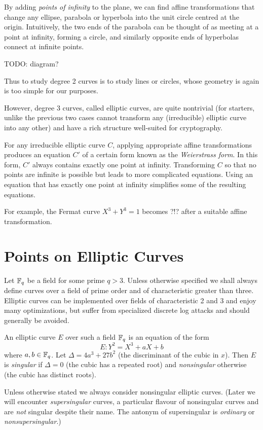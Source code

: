By adding \emph{points of infinity} to the plane, we can find affine
transformations that change any ellipse, parabola or hyperbola into the
unit circle centred at the origin. Intuitively, the two ends of the parabola
can be thought of as meeting
at a point at infinity, forming a circle,
and similarly opposite ends of hyperbolas connect at infinite points.

TODO: diagram?

Thus to study degree 2 curves is to study lines or circles, whose geometry
is again is too simple for our purposes.

However, degree 3 curves, called elliptic curves,
are quite nontrivial (for starters, unlike the previous two
cases cannot transform any (irreducible) elliptic curve into
any other)
and have a rich structure well-suited for cryptography.

For any irreducible elliptic curve $C$,
applying appropriate affine transformations
produces an equation $C'$ of a certain form known
as the \emph{Weierstrass form}.
In this form, $C'$ always contains exactly one point at infinity.
Transforming $C$ so
that no points are infinite is
possible but leads to more complicated
equations. Using an equation that has
exactly one point at infinity simplifies some of the resulting equations.

For example, the Fermat curve $X^3 + Y^3 = 1$ becomes
?!? after a suitable affine transformation.

\section {Points on Elliptic Curves}

Let $\mathbb{F}_q$ be a field for some prime $q > 3$.
Unless otherwise specified we shall always
define curves over a field of prime order and of characteristic greater
than three.
Elliptic curves can be implemented over fields of characteristic 2 and 3
and enjoy many optimizations,
but suffer from specialized discrete log attacks and should generally
be avoided.

An elliptic curve $E$ over such a field $\mathbb{F}_q$ is an equation of the form
\[ E: Y^2 = X^3 + a X + b \]
where $a, b \in \mathbb{F}_q$.
Let $\Delta = 4 a^3 + 27b^2$ (the discriminant of the cubic in $x$). Then
$E$ is \emph{singular} if $\Delta = 0$ (the cubic has a repeated root)
and \emph{nonsingular} otherwise (the cubic has distinct roots).

Unless otherwise stated we always consider nonsingular elliptic curves.
(Later we will encounter \emph{supersingular} curves, a particular
flavour of nonsingular curves and are \emph{not} singular despite their
name.
The antonym of supersingular is \emph{ordinary} or \emph{nonsupersingular}.)

